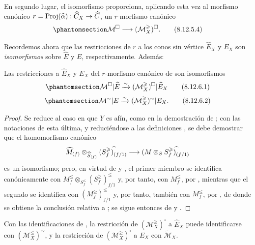 \documentclass[oneside,10pt]{amsart}
\makeatletter
\renewcommand{\leq}{\leqslant}
\renewcommand{\geq}{\geqslant}
\newcommand{\ega@arrow}[2]{\mathchoice{#1}{#2}{#2}{#2}}
\renewcommand{\to}{\ega@arrow{\longrightarrow}{\rightarrow}}
\let\EGAOriginalLabel\label
\renewcommand{\label}[1]{\phantomsection\EGAOriginalLabel{#1}}
\makeatother
\begin{document}
\begin{env}[8.12.5]
En segundo lugar, el isomorfismo  proporciona, aplicando esta vez  al morfismo canónico $r=\operatorname{Proj}(\widehat{\alpha}):\widehat{C}_X\to
\widehat{C}$, un $r$-morfismo canónico
\begin{equation}
\label{II.8.12.5.4-fr}
  \mathcal{M}^{\square}\to(\mathcal{M}_X^{\geq})^{\square}.
\tag{8.12.5.4}
\end{equation}

Recordemos ahora  que las restricciones de $r$ a los conos sin vértice $\widehat{E}_X$ y $E_X$ son \emph{isomorfismos} sobre $\widehat{E}$ y $E$, respectivamente.
Además:
\end{env}

\begin{proposition}[8.12.6]
\label{II.8.12.6-fr}
Las restricciones a $\widehat{E}_X$ y $E_X$ del $r$-morfismo canónico de  son isomorfismos
\begin{equation}
\label{II.8.12.6.1-fr}
  \mathcal{M}^{\square}|\widehat{E}
  \xrightarrow{\sim}(\mathcal{M}_X^{\geq})^{\square}|\widehat{E}_X
\tag{8.12.6.1}
\end{equation}
\begin{equation}
\label{II.8.12.6.2-fr}
  \mathcal{M}^{\sim}|E
  \xrightarrow{\sim}(\mathcal{M}_X^{\geq})^{\sim}|E_X.
\tag{8.12.6.2}
\end{equation}
\end{proposition}

\begin{proof}
Se reduce al caso en que $Y$ es afín, como en la demostración de  ; con las notaciones de esta última, y reduciéndose a las definiciones , se debe demostrar que el homomorfismo canónico
\[
  \widehat{M}_{(f)}\otimes_{\widehat{S}_{(f)}}
  (S_f^{\geq})_{(f/1)}^{\widehat{\,}}
  \to(M\otimes_S S_f^{\geq})_{(f/1)}^{\widehat{\,}}
\]
es un isomorfismo;
pero, en virtud de  y , el primer miembro se identifica canónicamente con $M_f^{\leq}\otimes_{S_f^{\leq}}(S_f^{\geq})_{f/1}^{\leq}$ y, por tanto, con $M_f^{\leq}$, por , mientras que el segundo se identifica con $(M_f^{\geq})_{f/1}^{\leq}$ y, por tanto, también con $M_f^{\leq}$, por , de donde se obtiene la conclusión relativa a ;
 se sigue entonces de  y .
\end{proof}

\begin{corollary}[8.12.7]
\label{II.8.12.7-fr}
Con las identificaciones de , la restricción de $(\mathcal{M}_X^{\geq})^{\square}$ a $\widehat{E}_X$ puede identificarse con $(\mathcal{M}_X^{\leq})^{\sim}$, y la restricción de $(\mathcal{M}_X^{\geq})^{\square}$ a $E_X$ con $\widetilde{\mathcal{M}}_X$.
\end{corollary}
\end{document}
